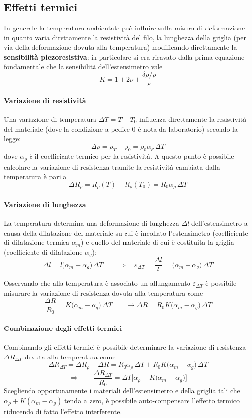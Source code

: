 	\subsection{Effetti termici}
		In generale la temperatura ambientale può influire sulla misura di deformazione in quanto varia direttamente la resistività del filo, la lunghezza della griglia (per via della deformazione dovuta alla temperatura) modificando direttamente la \textbf{sensibilità piezoresistiva}; in particolare si era ricavato dalla prima equazione fondamentale che la sensibilità dell'estensimetro vale
		\[ K = 1 + 2\nu + \frac{\delta \rho / \rho}{\varepsilon}\]
		
		\paragraph{Variazione di resistività} Una variazione di temperatura $\Delta T = T - T_0$ influenza direttamente la resistività del materiale (dove la condizione a pedice 0 è nota da laboratorio) secondo la legge:
		\[ \Delta \rho = \rho_T - \rho_0 = \rho_0 \alpha_\rho \, \Delta T  \]
		dove $\alpha_\rho$ è il coefficiente termico per la resistività. A questo punto è possibile calcolare la variazione di resistenza tramite la resistività cambiata dalla temperatura è pari a 
		\[ \Delta R_\rho = R_\rho(T) - R_\rho(T_0) = R_0\alpha_\rho \, \Delta T  \]
		
		\paragraph{Variazione di lunghezza} La temperatura determina una deformazione di lunghezza $\Delta l$ dell'estensimetro a causa della dilatazione del materiale su cui è incollato l'estensimetro (coefficiente di dilatazione termica $\alpha_m$) e quello del materiale di cui è costituita la griglia (coefficiente di dilatazione $\alpha_g$):
		\[  \Delta l = l \big(\alpha_m - \alpha_g\big) \, \Delta T \qquad \Rightarrow \quad \varepsilon_{\Delta T} = \frac{\Delta l}{l} = \big(\alpha_m-\alpha_g\big) \, \Delta T  \]
		
		Osservando che alla temperatura è associato un allungamento $\varepsilon_{\Delta T}$ è possibile misurare la variazione di resistenza dovuta alla temperatura come
		\[ \frac{\Delta R}{R_0} = K \big(\alpha_m-\alpha_g\big)\, \Delta T \qquad \rightarrow \Delta R = R_0 K \big(\alpha_m - \alpha_g\big) \, \Delta T   \]
		
		\paragraph{Combinazione degli effetti termici} Combinando gli effetti termici è possibile determinare la variazione di resistenza $\Delta R_{\Delta T}$ dovuta alla temperatura come
		\[ \Delta R_{\Delta T} = \Delta R_\rho + \Delta R = R_0 \alpha_\rho \, \Delta T + R_0 K \big(\alpha_m - \alpha_g\big) \, \Delta T  \]
		\[ \Rightarrow \qquad \frac{\Delta R_{\Delta T}}{R_0} = \Delta T \Big[ \alpha_\rho + K \big(\alpha_m-\alpha_g\big)\Big]  \]
		Scegliendo opportunamente i materiali dell'estensimetro e della griglia tali che $\alpha_\rho + K(\alpha_m-\alpha_g)$ tenda a zero, è possibile auto-compensare l'effetto termico riducendo di fatto l'effetto interferente.
		
